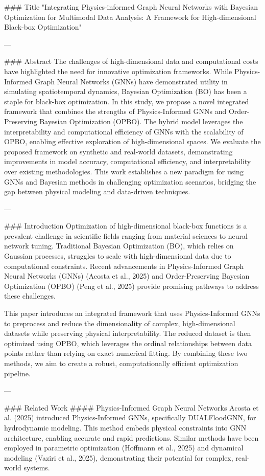 ### Title  
"Integrating Physics-informed Graph Neural Networks with Bayesian Optimization for Multimodal Data Analysis: A Framework for High-dimensional Black-box Optimization"

---

### Abstract  
The challenges of high-dimensional data and computational costs have highlighted the need for innovative optimization frameworks. While Physics-Informed Graph Neural Networks (GNNs) have demonstrated utility in simulating spatiotemporal dynamics, Bayesian Optimization (BO) has been a staple for black-box optimization. In this study, we propose a novel integrated framework that combines the strengths of Physics-Informed GNNs and Order-Preserving Bayesian Optimization (OPBO). The hybrid model leverages the interpretability and computational efficiency of GNNs with the scalability of OPBO, enabling effective exploration of high-dimensional spaces. We evaluate the proposed framework on synthetic and real-world datasets, demonstrating improvements in model accuracy, computational efficiency, and interpretability over existing methodologies. This work establishes a new paradigm for using GNNs and Bayesian methods in challenging optimization scenarios, bridging the gap between physical modeling and data-driven techniques.

---

### Introduction  
Optimization of high-dimensional black-box functions is a prevalent challenge in scientific fields ranging from material sciences to neural network tuning. Traditional Bayesian Optimization (BO), which relies on Gaussian processes, struggles to scale with high-dimensional data due to computational constraints. Recent advancements in Physics-Informed Graph Neural Networks (GNNs) (Acosta et al., 2025) and Order-Preserving Bayesian Optimization (OPBO) (Peng et al., 2025) provide promising pathways to address these challenges. 

This paper introduces an integrated framework that uses Physics-Informed GNNs to preprocess and reduce the dimensionality of complex, high-dimensional datasets while preserving physical interpretability. The reduced dataset is then optimized using OPBO, which leverages the ordinal relationships between data points rather than relying on exact numerical fitting. By combining these two methods, we aim to create a robust, computationally efficient optimization pipeline. 

---

### Related Work  
#### Physics-Informed Graph Neural Networks  
Acosta et al. (2025) introduced Physics-Informed GNNs, specifically DUALFloodGNN, for hydrodynamic modeling. This method embeds physical constraints into GNN architecture, enabling accurate and rapid predictions. Similar methods have been employed in parametric optimization (Hoffmann et al., 2025) and dynamical modeling (Vaziri et al., 2025), demonstrating their potential for complex, real-world systems.


